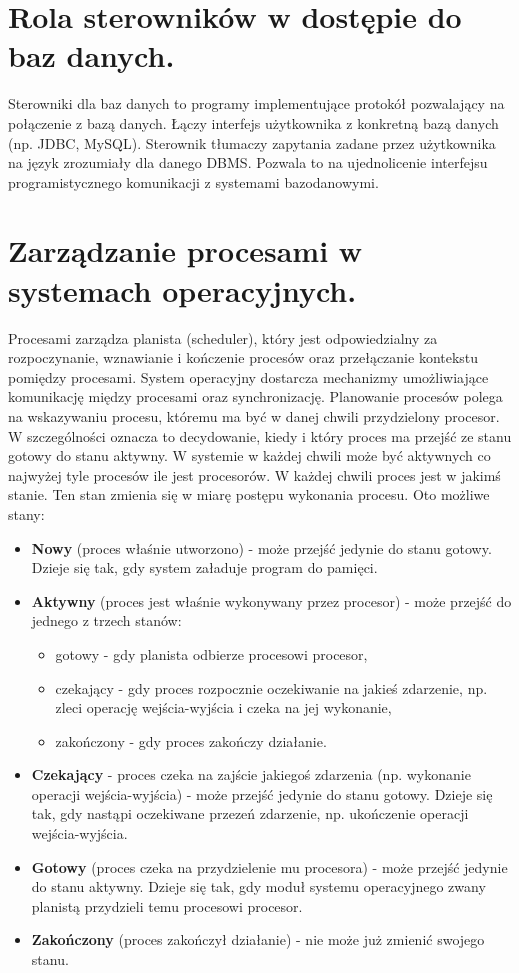 \documentclass[12pt,a4paper]{article}
\begin{document}
	\section{Rola sterowników w dostępie do baz danych.}
	Sterowniki dla baz danych to programy implementujące protokół pozwalający na połączenie z bazą danych. Łączy interfejs użytkownika z konkretną bazą danych (np. JDBC, MySQL). Sterownik tłumaczy zapytania zadane przez użytkownika na język zrozumiały dla danego DBMS. Pozwala to na ujednolicenie interfejsu programistycznego komunikacji z systemami bazodanowymi.

	\section{Zarządzanie procesami w systemach operacyjnych.}
	Procesami zarządza planista (scheduler), który jest odpowiedzialny za rozpoczynanie, wznawianie i kończenie procesów oraz przełączanie kontekstu pomiędzy procesami. System operacyjny dostarcza mechanizmy umożliwiające komunikację między procesami oraz synchronizację. Planowanie procesów polega na wskazywaniu procesu, któremu ma być w danej chwili przydzielony procesor. W szczególności oznacza to decydowanie, kiedy i który proces ma przejść ze stanu gotowy do stanu aktywny. W systemie w każdej chwili może być aktywnych co najwyżej tyle procesów ile jest procesorów. W każdej chwili proces jest w jakimś stanie. Ten stan zmienia się w miarę postępu wykonania procesu. Oto możliwe stany:
	
	\begin{itemize}
		\item \textbf{Nowy} (proces właśnie utworzono) - może przejść jedynie do stanu gotowy. Dzieje się tak, gdy system załaduje program do pamięci.
		\item \textbf{Aktywny} (proces jest właśnie wykonywany przez procesor) - może przejść do jednego z trzech stanów:
		\begin{itemize}
			\item gotowy - gdy planista odbierze procesowi procesor,
			\item czekający - gdy proces rozpocznie oczekiwanie na jakieś zdarzenie, np. zleci operację wejścia-wyjścia i czeka na jej wykonanie,
			\item zakończony - gdy proces zakończy działanie.
		\end{itemize}
		\item \textbf{Czekający} - proces czeka na zajście jakiegoś zdarzenia (np. wykonanie operacji wejścia-wyjścia) -  może przejść jedynie do stanu gotowy. Dzieje się tak, gdy nastąpi oczekiwane przezeń zdarzenie, np. ukończenie operacji wejścia-wyjścia.
		\item \textbf{Gotowy} (proces czeka na przydzielenie mu procesora) - może przejść jedynie do stanu aktywny. Dzieje się tak, gdy moduł systemu operacyjnego zwany planistą przydzieli temu procesowi procesor.
		\item \textbf{Zakończony} (proces zakończył działanie) - nie może już zmienić swojego stanu.
	\end{itemize}
\end{document}
